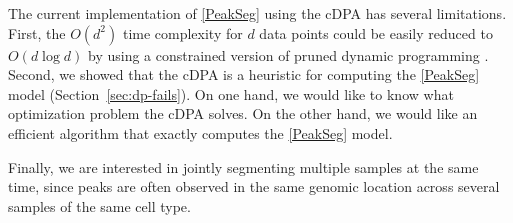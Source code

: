 \documentclass{article}
\begin{document}
The current implementation of \ref{PeakSeg} using the cDPA has several
limitations. First, the $O(d^2)$ time complexity for $d$ data points
could be easily reduced to $O(d\log d)$ by using a constrained version
of pruned dynamic programming \citep{pruned-dp, Segmentor}. Second, we
showed that the cDPA is a heuristic for computing the \ref{PeakSeg}
model (Section~\ref{sec:dp-fails}). On one hand, we would like to know
what optimization problem the cDPA solves. On the other hand, we would
like an efficient algorithm that exactly computes the \ref{PeakSeg}
model.

Finally, we are interested in jointly segmenting multiple samples at
the same time, since peaks are often observed in the same genomic
location across several samples of the same cell type.


\newpage 




\end{document}
